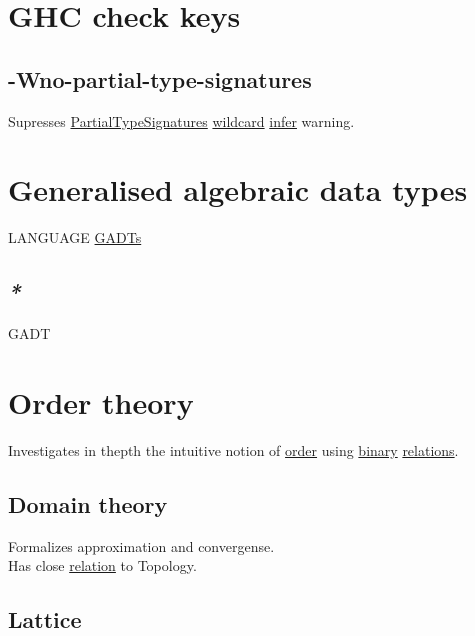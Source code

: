 \documentclass[a4paper,14pt,oneside]{book}
\begin{document}
\chapter{\label{org993b2ab}GHC check keys}
\label{sec:orgf190bad}

\section{\label{org90310d1}-Wno-partial-type-signatures}
\label{sec:orgf027384}

Supresses \hyperref[org9d7a22a]{PartialTypeSignatures} \hyperref[org9bd5c11]{wildcard} \hyperref[orgcb0efff]{infer} warning.\\

\chapter{\label{orgab6c64f}Generalised algebraic data types}
\label{sec:orgc4d0aff}

LANGUAGE \hyperref[org9147a7d]{GADTs}\\

\section{\emph{*}}
\label{sec:org674363d}

\label{orgebb9de9}GADT\\

\chapter{\label{org4ebf28b}Order theory}
\label{sec:org9a88c7a}

Investigates in thepth the intuitive notion of \hyperref[org1313c5f]{order} using \hyperref[orgd4bd390]{binary} \hyperref[orgd960451]{relations}.\\

\section{\label{orgcacbf24}Domain theory}
\label{sec:orgb01d87d}

Formalizes approximation and convergense.\\
Has close \hyperref[org3bec6ce]{relation} to Topology.\\

\section{\label{orgad1f75f}Lattice}
\label{sec:org7fc43ba}
\end{document}
